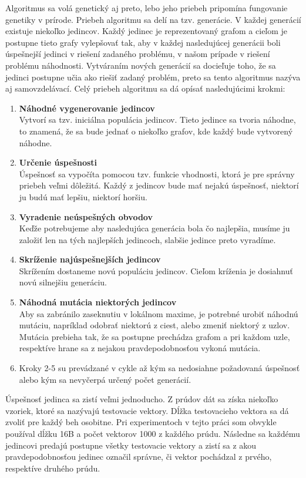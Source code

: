 Algoritmus sa volá genetický aj preto, lebo jeho priebeh pripomína fungovanie genetiky v prírode. Priebeh algoritmu sa delí na tzv. generácie. V každej generácií existuje niekoľko jedincov. Každý jedinec je reprezentovaný grafom a cieľom je postupne tieto grafy vylepšovať tak, aby v každej nasledujúcej generácii boli úspešnejší jedinci v riešení zadaného problému, v našom prípade v riešení problému náhodnosti. Vytváraním nových generácií sa docieľuje toho, že sa jedinci postupne učia ako riešiť zadaný problém, preto sa tento algoritmus nazýva aj samovzdelávací. Celý priebeh algoritmu sa dá opísať nasledujúcimi krokmi:\vspace{-10pt}
\begin{enumerate}
	\item \textbf{Náhodné vygenerovanie jedincov}\\Vytvorí sa tzv. iniciálna populácia jedincov. Tieto jedince sa tvoria náhodne, to znamená, že sa bude jednať o niekoľko grafov, kde každý bude vytvorený náhodne.
	\item \textbf{Určenie úspešnosti}\\Úspešnosť sa vypočíta pomocou tzv. funkcie vhodnosti, ktorá je pre správny priebeh veľmi dôležitá. Každý z jedincov bude mať nejakú úspešnosť, niektorí ju budú mať lepšiu, niektorí horšiu.
	\item \textbf{Vyradenie neúspešných obvodov}\\Keďže potrebujeme aby nasledujúca generácia bola čo najlepšia, musíme ju založiť len na tých najlepších jedincoch, slabšie jedince preto vyradíme.
	\item \textbf{Skríženie najúspešnejších jedincov}\\Skrížením dostaneme novú populáciu jedincov. Cieľom kríženia je dosiahnuť novú silnejšiu generáciu.
	\item \textbf{Náhodná mutácia niektorých jedincov}\\Aby sa zabránilo zaseknutiu v lokálnom maxime, je potrebné urobiť náhodnú mutáciu, napríklad odobrať niektorú z ciest, alebo zmeniť niektorý z uzlov. Mutácia prebieha tak, že sa postupne prechádza grafom a pri každom uzle, respektíve hrane sa z nejakou pravdepodobnosťou vykoná mutácia.
	\item Kroky 2-5 su prevádzané v cykle až kým sa nedosiahne požadovaná úspešnosť alebo kým sa nevyčerpá určený počet generácií.
\end{enumerate}
Úspešnosť jedinca sa zistí veľmi jednoducho. Z prúdov dát sa získa niekoľko vzoriek, ktoré sa nazývajú testovacie vektory. Dĺžka testovacieho vektora sa dá zvoliť pre každý beh osobitne. Pri experimentoch v tejto práci som obvykle používal dĺžku 16B a počet vektorov 1000 z každého prúdu. Následne sa každému jedincovi predajú postupne všetky testovacie vektory a zistí sa z akou pravdepodobnosťou jedinec označil správne, či vektor pochádzal z prvého, respektíve druhého prúdu. 

